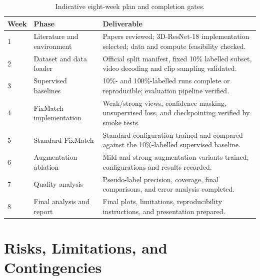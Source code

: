 \documentclass[11pt,a4paper]{article}
\begin{document}
\begin{table}[H]
\centering
\small
\caption{Indicative eight-week plan and completion gates.}
\begin{tabularx}{\textwidth}{L{1.4cm}L{3.2cm}Y}
\toprule
\textbf{Week} & \textbf{Phase} & \textbf{Deliverable} \\
 & Literature and environment & Papers reviewed; 3D-ResNet-18 implementation selected; data and compute feasibility checked. \\
2 & Dataset and data loader & Official split manifest, fixed 10\% labelled subset, video decoding and clip sampling validated. \\
3 & Supervised baselines & 10\%- and 100\%-labelled runs complete or reproducible; evaluation pipeline verified. \\
4 & FixMatch implementation & Weak/strong views, confidence masking, unsupervised loss, and checkpointing verified by smoke tests. \\
5 & Standard FixMatch & Standard configuration trained and compared against the 10\%-labelled supervised baseline. \\
6 & Augmentation ablation & Mild and strong augmentation variants trained; configurations and results recorded. \\
7 & Quality analysis & Pseudo-label precision, coverage, final comparisons, and error analysis completed. \\
8 & Final analysis and report & Final plots, limitations, reproducibility instructions, and presentation prepared. \\
\bottomrule
\end{tabularx}
\end{table}

\section{Risks, Limitations, and Contingencies}
\end{document}
